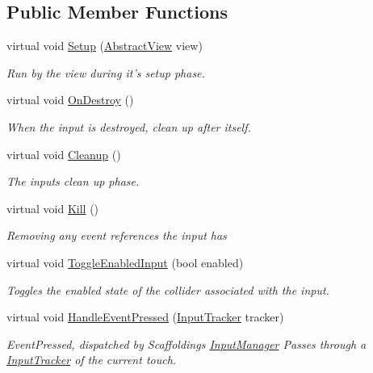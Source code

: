 \subsection*{Public Member Functions}
\begin{DoxyCompactItemize}
\item 
virtual void \hyperlink{class_scaffolding_1_1_abstract_input_a598859c6342920d2b0c985310e6e9476}{Setup} (\hyperlink{class_scaffolding_1_1_abstract_view}{Abstract\-View} view)
\begin{DoxyCompactList}\small\item\em Run by the view during it's setup phase. \end{DoxyCompactList}\item 
virtual void \hyperlink{class_scaffolding_1_1_abstract_input_a15d8f76fe4f335c622be311cfbec8b27}{On\-Destroy} ()
\begin{DoxyCompactList}\small\item\em When the input is destroyed, clean up after itself. \end{DoxyCompactList}\item 
virtual void \hyperlink{class_scaffolding_1_1_abstract_input_ab179ae99e76c6c934a0dcba4fc195e68}{Cleanup} ()
\begin{DoxyCompactList}\small\item\em The inputs clean up phase. \end{DoxyCompactList}\item 
virtual void \hyperlink{class_scaffolding_1_1_abstract_input_af1ca6d47fda48013c3521f106944d9af}{Kill} ()
\begin{DoxyCompactList}\small\item\em Removing any event references the input has \end{DoxyCompactList}\item 
virtual void \hyperlink{class_scaffolding_1_1_abstract_input_a5b19183daa9bbef63dd4637d7197c077}{Toggle\-Enabled\-Input} (bool enabled)
\begin{DoxyCompactList}\small\item\em Toggles the enabled state of the collider associated with the input. \end{DoxyCompactList}\item 
virtual void \hyperlink{class_scaffolding_1_1_abstract_input_a11e83c3462719749f8281a21024e902f}{Handle\-Event\-Pressed} (\hyperlink{class_scaffolding_1_1_input_tracker}{Input\-Tracker} tracker)
\begin{DoxyCompactList}\small\item\em Event\-Pressed, dispatched by Scaffoldings \hyperlink{class_scaffolding_1_1_input_manager}{Input\-Manager} Passes through a \hyperlink{class_scaffolding_1_1_input_tracker}{Input\-Tracker} of the current touch. \end{DoxyCompactList}\item 

\end{DoxyCompactItemize}
